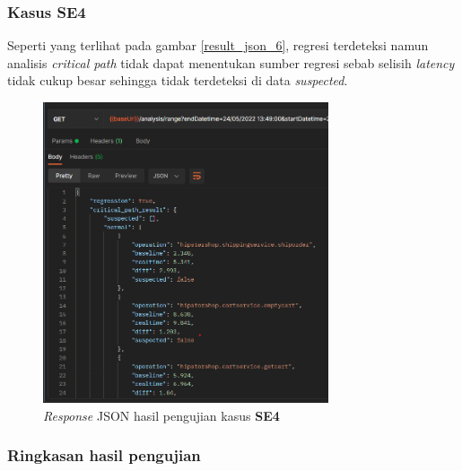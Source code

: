 \subsubsection{Kasus SE4}
Seperti yang terlihat pada gambar \ref{result_json_6}, regresi terdeteksi namun analisis \textit{critical path} tidak dapat menentukan sumber regresi sebab selisih \textit{latency} tidak cukup besar sehingga tidak terdeteksi di data \textit{suspected}.
\begin{figure}[!htb]
	\centering
	\includegraphics[width=0.75\textwidth]{resources/ch4/json/11.png}
	\caption{\textit{Response} JSON hasil pengujian kasus \textbf{SE4}}
	\label{result_json_9}
\end{figure}

\pagebreak

\subsubsection{Ringkasan hasil pengujian}

